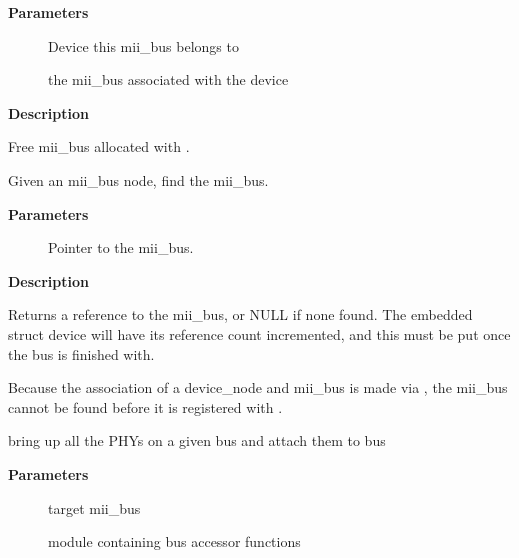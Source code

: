 \documentclass[a4paper,8pt,english]{sphinxmanual}
\begin{document}
\textbf{Parameters}
\begin{description}
\item[{}] \leavevmode
Device this mii\_bus belongs to

\item[{}] \leavevmode
the mii\_bus associated with the device

\end{description}

\textbf{Description}

Free mii\_bus allocated with {\hyperref[networking/kapi:c.devm_mdiobus_alloc_size]{\emph{}}}.

\begin{fulllineitems}
\label{networking/kapi:c.of_mdio_find_bus}
Given an mii\_bus node, find the mii\_bus.

\end{fulllineitems}


\textbf{Parameters}
\begin{description}
\item[{}] \leavevmode
Pointer to the mii\_bus.

\end{description}

\textbf{Description}

Returns a reference to the mii\_bus, or NULL if none found.  The
embedded struct device will have its reference count incremented,
and this must be put once the bus is finished with.

Because the association of a device\_node and mii\_bus is made via
, the mii\_bus cannot be found before it is
registered with .

\begin{fulllineitems}
\label{networking/kapi:c.__mdiobus_register}
bring up all the PHYs on a given bus and attach them to bus

\end{fulllineitems}


\textbf{Parameters}
\begin{description}
\item[{}] \leavevmode
target mii\_bus

\item[{}] \leavevmode
module containing bus accessor functions

\end{description}
\end{document}
